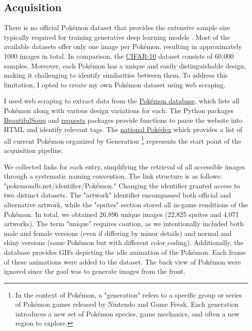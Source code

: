\documentclass[12pt]{article}
\theoremstyle{plain}
\theoremstyle{definition}
\theoremstyle{remark}
\begin{document}
\subsection{Acquisition}
There is no official Pokémon dataset that provides the extensive sample size typically required for training generative deep learning models \citep{Yang2023}. Most of the available datasets offer only one image per Pokémon, resulting in approximately 1000 images in total. In comparison, the \href{https://www.cs.toronto.edu/~kriz/cifar.html}{\ac{CIFAR-10}} dataset consists of 60,000 samples. Moreover, each Pokémon has a unique and easily distinguishable design, making it challenging to identify similarities between them. To address this limitation, I opted to create my own Pokémon dataset using web scraping.

I used web scraping to extract data from the \href{https://pokemondb.net/}{Pokémon database}, which lists all Pokémon along with various design variations for each. The Python packages \href{https://www.crummy.com/software/BeautifulSoup/bs4/doc/}{BeautifulSoup} and \href{https://requests.readthedocs.io/en/latest/}{requests} packages provide functions to parse the website into \ac{HTML} and identify relevant tags. The \href{https://pokemondb.net/pokedex/national}{national Pokédex} which provides a list of all current Pokémon organized by Generation \footnote{In the context of Pokémon, a "generation" refers to a specific group or series of Pokémon games released by Nintendo and Game Freak. Each generation introduces a new set of Pokémon species, game mechanics, and often a new region to explore.} represents the start point of the acquisition pipeline.

We collected links for each entry, simplifying the retrieval of all accessible images through a systematic naming convention. The link structure is as follows: "pokemondb.net/identifier/Pokémon." Changing the identifier granted access to two distinct datasets. The "artwork" identifier encompassed both official and alternative artwork, while the "sprites" section stored all in-game renditions of the Pokémon. In total, we obtained 26,896 unique images (22,825 sprites and 4,071 artworks). The term "unique" requires caution, as we intentionally included both male and female versions (even if differing by minor details) and normal and shiny versions (same Pokémon but with different color coding). Additionally, the database provides GIFs depicting the idle animation of the Pokémon. Each frame of these animations were added to the dataset. The back view of Pokémon were ignored since the goal was to generate images from the front. 
\end{document}
